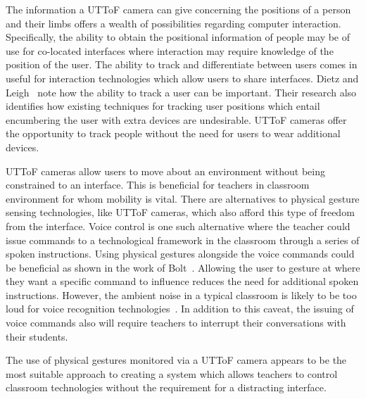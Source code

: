 \documentclass[manuscript, review, screen]{acmart}
\begin{document}
The information a \ac{UTToF} camera can give concerning the positions of a person and their limbs offers a wealth of possibilities regarding computer interaction.
Specifically, the ability to obtain the positional information of people may be of use for co-located interfaces where interaction may require knowledge of the position of the user.
The ability to track and differentiate between users comes in useful for interaction technologies which allow users to share interfaces.
Dietz and Leigh~\cite{Dietz2001} note how the ability to track a user can be important.
Their research also identifies how existing techniques for tracking user positions which entail encumbering the user with extra devices are undesirable.
\ac{UTToF} cameras offer the opportunity to track people without the need for users to wear additional devices.

\ac{UTToF} cameras allow users to move about an environment without being constrained to an interface.
This is beneficial for teachers in classroom environment for whom mobility is vital.
There are alternatives to physical gesture sensing technologies, like \ac{UTToF} cameras, which also afford this type of freedom from the interface.
Voice control is one such alternative where the teacher could issue commands to a technological framework in the classroom through a series of spoken instructions.
Using physical gestures alongside the voice commands could be beneficial as shown in the work of Bolt~\citeyearpar{Bolt1980}.
Allowing the user to gesture at where they want a specific command to influence reduces the need for additional spoken instructions.
However, the ambient noise in a typical classroom is likely to be too loud for voice recognition technologies~\cite{Cavalier1996,Goette1998,OHare1999}.
In addition to this caveat, the issuing of voice commands also will require teachers to interrupt their conversations with their students.

The use of physical gestures monitored via a \ac{UTToF} camera appears to be the most suitable approach to creating a system which allows teachers to control classroom technologies without the requirement for a distracting interface.


\end{document}
